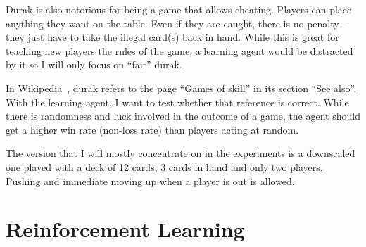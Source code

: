 \documentclass[a4paper,titlepage]{article}
\begin{document}
Durak is also notorious for being a game that allows cheating. Players can place anything they want on the table. Even if they are caught, there is no penalty -- they just have to take the illegal card(s) back in hand. While this is great for teaching new players the rules of the game, a learning agent would be distracted by it so I will only focus on ``fair'' durak.

In Wikipedia~\cite{wikidurak}, durak refers to the page ``Games of skill'' in its section ``See also''. With the learning agent, I want to test whether that reference is correct. While there is randomness and luck involved in the outcome of a game, the agent should get a higher win rate (non-loss rate) than players acting at random. \medskip

The version that I will mostly concentrate on in the experiments is a downscaled one played with a deck of 12 cards, 3 cards in hand and only two players.
Pushing and immediate moving up when a player is out is allowed.

\newpage

\section{Reinforcement Learning}
\end{document}
